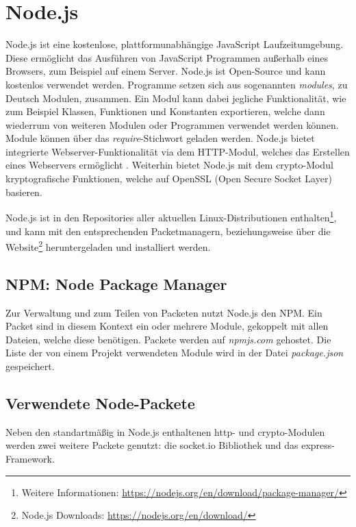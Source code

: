 \section{Node.js}
Node.js ist eine kostenlose, plattformunabhängige JavaScript Laufzeitumgebung.
Diese ermöglicht das Ausführen von JavaScript Programmen außerhalb eines Browsers, zum Beispiel auf einem Server. Node.js ist Open-Source und kann kostenlos verwendet werden. Programme setzen sich aus sogenannten \textit{modules}, zu Deutsch Modulen, zusammen. Ein Modul kann dabei jegliche Funktionalität, wie zum Beispiel Klassen, Funktionen und Konstanten exportieren, welche dann wiederrum von weiteren Modulen oder Programmen verwendet werden können. Module können über das \textit{require}-Stichwort geladen werden. Node.js bietet integrierte Webserver-Funktionalität via dem \acs{HTTP}-Modul, welches das Erstellen eines Webservers ermöglicht \cite{nodejs}. Weiterhin bietet Node.js mit dem \glqq{}crypto\grqq{}-Modul kryptografische Funktionen, welche auf OpenSSL (Open Secure Socket Layer) basieren.\par 

Node.js ist in den Repositories aller aktuellen Linux-Distributionen enthalten\footnote{Weitere Informationen: \url{https://nodejs.org/en/download/package-manager/}}, und kann mit den entsprechenden Packetmanagern, beziehungsweise über die Website\footnote{Node.js Downloads: \url{https://nodejs.org/en/download/}} heruntergeladen und installiert werden.\par

\subsection{NPM: Node Package Manager}
Zur Verwaltung und zum Teilen von Packeten nutzt Node.js den \ac{NPM}. Ein Packet sind in diesem Kontext ein oder mehrere Module, gekoppelt mit allen Dateien, welche diese benötigen. Packete werden auf \textit{npmjs.com} gehostet. Die Liste der von einem Projekt verwendeten Module wird in der Datei \textit{package.json} gespeichert.

\subsection{Verwendete Node-Packete}
Neben den standartmäßig in Node.js enthaltenen \glqq{}http\grqq{}- und \glqq{}crypto\grqq{}-Modulen werden zwei weitere Packete genutzt: die \glqq{}socket.io\grqq{} Bibliothek und das \glqq{}express\grqq{}-Framework.

